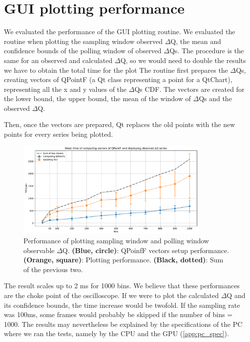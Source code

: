 \section{GUI plotting performance}
    We evaluated the performance of the GUI plotting routine. We evaluated the routine when plotting the sampling window observed $\Delta$Q, the mean and confidence bounds of the polling window of observed $\Delta$Qs. The procedure is the same for an observed and calculated $\Delta$Q, so we would need to double the results we have to obtain the total time for the plot
    The routine first prepares the $\Delta$Qs, creating vectors of QPointF (a Qt class representing a point for a QtChart), representing all the x and y values of the $\Delta$Qs CDF. The vectors are created for the lower bound, the upper bound, the mean of the window of $\Delta$Qs and the observed $\Delta$Q.

    Then, once the vectors are prepared, Qt replaces the old points with the new points for every series being plotted.

    \begin{figure}[H]
        \begin{center}
            \includegraphics[width = 0.85\textwidth]{img/plots.pdf}
        \end{center}
        \caption{Performance of plotting sampling window and polling window observable $\Delta$Q. \textbf{(Blue, circle)}: QPoinfF vectors setup performance. \textbf{(Orange, square)}: Plotting performance. \textbf{(Black, dotted)}: Sum of the previous two.}
    \end{figure}
    
    The result scales up to 2 ms for 1000 bins. We believe that these performances are the choke point of the oscilloscope. If we were to plot the calculated $\Delta$Q and its confidence bounds, the time increase would be twofold. If the sampling rate was 100ms, some frames would probably be skipped if the number of bins = 1000. The results may nevertheless be explained by the specifications of the PC where we ran the tests, namely by the CPU and the GPU (\cref{app:pc_spec}).
